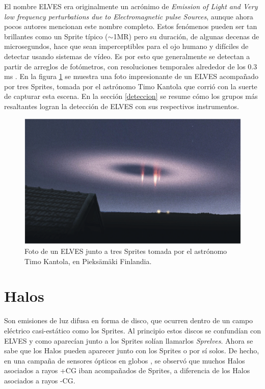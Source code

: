 \documentclass[12pt,oneside,openany,letter]{book}
\begin{document}
El nombre ELVES era originalmente un acrónimo de \textit{Emission of Light and Very low frequency perturbations due to Electromagnetic pulse Sources}, aunque ahora pocos autores mencionan este nombre completo. Estos fenómenos pueden ser tan brillantes como un Sprite típico ($\sim$1MR) pero su duración, de algunas decenas de microsegundos, hace que sean imperceptibles para el ojo humano y difíciles de detectar usando sistemas de vídeo. Es por esto que generalmente se detectan a partir de arreglos de fotómetros, con resoluciones temporales alrededor de los 0.3 ms \cite{Maiorana2014}. En la figura \ref{fig:elves_photo} se muestra una foto impresionante de un ELVES acompañado por tres Sprites, tomada por el astrónomo Timo Kantola que corrió con la suerte de capturar esta escena. En la sección \ref{deteccion} se resume cómo los grupos más resaltantes logran la detección de ELVES con sus respectivos instrumentos. 
\begin{figure}
    \centering
    \includegraphics[scale=0.65]{figures/elves_photo.png}
    \caption[Foto de un ELVES tomada por el astrónomo Timo Kantola]{Foto de un ELVES junto a tres Sprites tomada por el astrónomo Timo Kantola, en Pieksämäki Finlandia.}
    \label{fig:elves_photo}
\end{figure} 

\section{Halos}
Son emisiones de luz difusa en forma de disco, que ocurren dentro de un campo eléctrico casi-estático como los Sprites. Al principio estos discos se confundían con ELVES y como aparecían junto a los Sprites solían llamarlos \textit{Sprelves}. Ahora se sabe que los Halos pueden aparecer junto con los Sprites o por sí solos. De hecho, en una campaña de sensores ópticos en globos \cite{BeringEtal2004}, se observó que muchos Halos asociados a rayos +CG iban acompañados de Sprites, a diferencia de los Halos asociados a rayos -CG.
\end{document}
